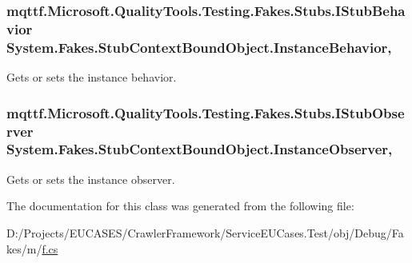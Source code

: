 \hypertarget{class_system_1_1_fakes_1_1_stub_context_bound_object_a190b1d6439ece219f14b0ef25ce02110}{
\subsubsection[{Instance\-Behavior}]{\setlength{\rightskip}{0pt plus 5cm}mqttf.\-Microsoft.\-Quality\-Tools.\-Testing.\-Fakes.\-Stubs.\-I\-Stub\-Behavior System.\-Fakes.\-Stub\-Context\-Bound\-Object.\-Instance\-Behavior\hspace{0.3cm}{\ttfamily [get]}, {\ttfamily [set]}}}\label{class_system_1_1_fakes_1_1_stub_context_bound_object_a190b1d6439ece219f14b0ef25ce02110}


Gets or sets the instance behavior.

\hypertarget{class_system_1_1_fakes_1_1_stub_context_bound_object_a7c0120dd9e54872aa3bf8dda3b5870f5}{
\subsubsection[{Instance\-Observer}]{\setlength{\rightskip}{0pt plus 5cm}mqttf.\-Microsoft.\-Quality\-Tools.\-Testing.\-Fakes.\-Stubs.\-I\-Stub\-Observer System.\-Fakes.\-Stub\-Context\-Bound\-Object.\-Instance\-Observer\hspace{0.3cm}{\ttfamily [get]}, {\ttfamily [set]}}}\label{class_system_1_1_fakes_1_1_stub_context_bound_object_a7c0120dd9e54872aa3bf8dda3b5870f5}


Gets or sets the instance observer.



The documentation for this class was generated from the following file\-:\begin{DoxyCompactItemize}
\item 
D\-:/\-Projects/\-E\-U\-C\-A\-S\-E\-S/\-Crawler\-Framework/\-Service\-E\-U\-Cases.\-Test/obj/\-Debug/\-Fakes/m/\hyperlink{m_2f_8cs}{f.\-cs}\end{DoxyCompactItemize}

